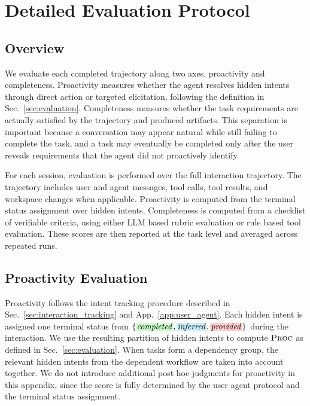 
\section{Detailed Evaluation Protocol}
\label{app:detailed_evaluation}

\subsection{Overview}
\label{app:eval_overview}

We evaluate each completed trajectory along two axes, proactivity and completeness. Proactivity measures whether the agent resolves hidden intents through direct action or targeted elicitation, following the definition in Sec.~\ref{sec:evaluation}. Completeness measures whether the task requirements are actually satisfied by the trajectory and produced artifacts. This separation is important because a conversation may appear natural while still failing to complete the task, and a task may eventually be completed only after the user reveals requirements that the agent did not proactively identify.

For each session, evaluation is performed over the full interaction trajectory. The trajectory includes user and agent messages, tool calls, tool results, and workspace changes when applicable. Proactivity is computed from the terminal status assignment over hidden intents. Completeness is computed from a checklist of verifiable criteria, using either LLM based rubric evaluation or rule based tool evaluation. These scores are then reported at the task level and averaged across repeated runs.

\subsection{Proactivity Evaluation}
\label{app:eval_proactivity}

Proactivity follows the intent tracking procedure described in Sec.~\ref{sec:interaction_tracking} and App.~\ref{app:user_agent}. Each hidden intent is assigned one terminal status from $\{\completed,\inferred,\provided\}$ during the interaction. We use the resulting partition of hidden intents to compute $\textsc{Proc}$ as defined in Sec.~\ref{sec:evaluation}. When tasks form a dependency group, the relevant hidden intents from the dependent workflow are taken into account together. We do not introduce additional post hoc judgments for proactivity in this appendix, since the score is fully determined by the user agent protocol and the terminal status assignment.

